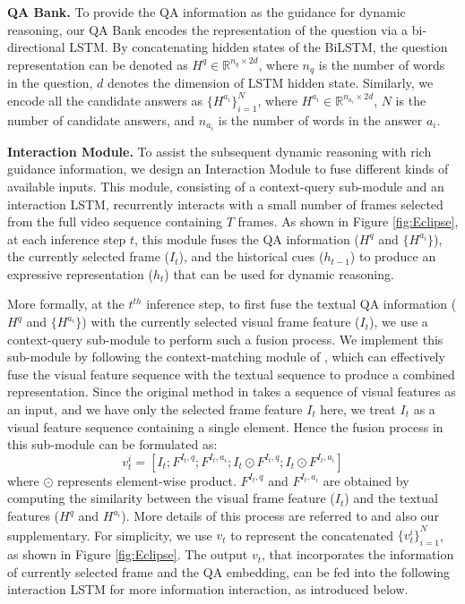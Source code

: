 \documentclass[final]{cvpr}
\begin{document}
{\bf QA Bank.} To provide the QA information as the guidance for dynamic reasoning, our QA Bank encodes the representation of the question via a bi-directional LSTM. 
By concatenating hidden states of the BiLSTM, the question representation can be denoted as $H^q\in\mathbb{R}^{n_q\times2d}$, where $n_q$ is the number of words in the question, $d$ denotes the dimension of LSTM hidden state. Similarly, we encode all the candidate answers as
${\{ H^{a_i} \}}^N_{i=1}$,
where $H^{a_i}\in\mathbb{R}^{n_{a_i}\times2d}$,
$N$ is the number of candidate answers, 
and $n_{a_i}$ is the number of words in the answer $a_i$.


{\bf Interaction Module.} To assist the subsequent dynamic reasoning with rich guidance information, we design an Interaction Module to fuse different kinds of available inputs. This module, consisting of a context-query sub-module and an interaction LSTM, recurrently interacts with a small number of frames selected from the full video sequence containing $T$ frames. As shown in Figure \ref{fig:Eclipse}, at each inference step $t$, this module fuses the QA information ($H^q$ and $\{H^{a_i}\}$),
the currently selected frame ($I_t$), and the historical cues ($h_{t-1}$)
to produce an expressive representation ($h_t$) that can be used for dynamic reasoning. 

More formally, at the $t^{th}$ inference step, to first fuse the textual QA information ($H^q$ and $\{H^{a_i}\}$) with the currently selected visual frame feature ($I_t$),
we use a context-query sub-module to perform such a fusion process. We implement this sub-module by following the context-matching module of \cite{lei2018tvqa}, which can effectively fuse the visual feature sequence with the textual sequence to produce a combined representation. Since the original method in \cite{lei2018tvqa} takes a sequence of visual features as an input, and we have only the selected frame feature $I_t$ here, we treat $I_t$ as a visual feature sequence containing a single element. Hence the fusion process in this sub-module can be formulated as:
\begin{equation}\label{eq.context-query}
    v^i_t=[I_t;F^{I_t,q};F^{I_t,a_i};I_t\odot F^{I_t,q};I_t\odot F^{I_t,a_i}]
\end{equation}
where $\odot$ represents element-wise product. $F^{I_t,q}$ and $F^{I_t,a_i}$ are obtained by computing the similarity between the visual frame feature ($I_t$) and the textual features ($H^q$ and $H^{a_i}$). More details of this process are referred to \cite{lei2018tvqa} and also our supplementary.
For simplicity, we use $v_t$ to represent the concatenated ${\{v^i_t \}}^N_{i=1}$, as shown in Figure \ref{fig:Eclipse}. The 
output $v_t$, that incorporates the information of currently selected frame and the QA embedding, can be fed into the following interaction LSTM for more information interaction, as introduced below.
\end{document}

